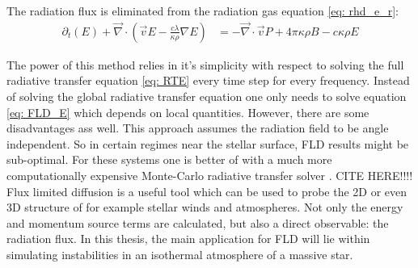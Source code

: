 The radiation flux is eliminated from the radiation gas equation \ref{eq: rhd_e_r}:
\begin{align}
 \partial_t \left(E \right) +  \vec{\nabla} \cdot \left( \vec{v} E -\frac{c \lambda}{\kappa \rho} \nabla E \right) &=  -\vec{\nabla} \cdot \vec{v} P + 4\pi \kappa\rho B - c \kappa \rho E \label{eq: FLD_E}
\end{align}

The power of this method relies in it's simplicity with respect to solving the full radiative transfer equation \eqref{eq: RTE} every time step for every frequency. Instead of solving the global radiative transfer equation one only needs to solve equation \eqref{eq: FLD_E} which depends on local quantities. However, there are some disadvantages ass well. This approach assumes the radiation field to be angle independent. So in certain regimes near the stellar surface, FLD results might be sub-optimal. For these systems one is better of with a much more computationally expensive Monte-Carlo radiative transfer solver \cite{}. CITE HERE!!!!\\

Flux limited diffusion is a useful tool which can be used to probe the 2D or even 3D structure of for example stellar winds and atmospheres. Not only the energy and momentum source terms are calculated, but also a direct observable: the radiation flux. In this thesis, the main application for FLD will lie within simulating instabilities in an isothermal atmosphere of a massive star.